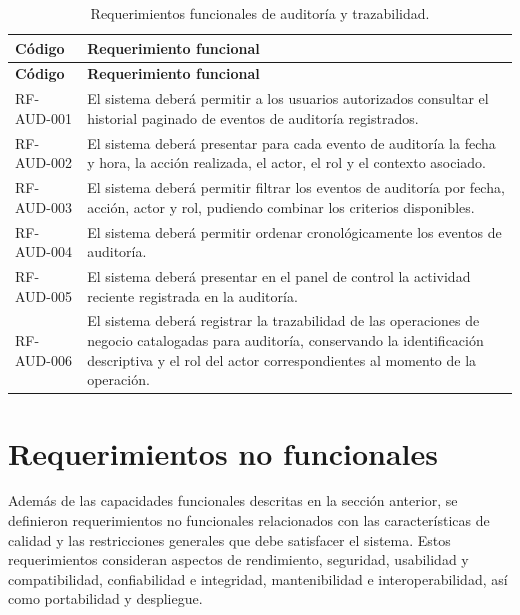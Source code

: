 \begin{longtable}{|p{}|p{}|}
    \caption{Requerimientos funcionales de auditoría y trazabilidad.}
    \label{tab:rf-aud}\\
    \hline
    \textbf{Código} & \textbf{Requerimiento funcional} \\
    \hline
    \endfirsthead

    \hline
    \textbf{Código} & \textbf{Requerimiento funcional} \\
    \hline
    \endhead

    RF-AUD-001 &
    El sistema deberá permitir a los usuarios autorizados consultar el
    historial paginado de eventos de auditoría registrados. \\
    \hline

    RF-AUD-002 &
    El sistema deberá presentar para cada evento de auditoría la fecha y hora,
    la acción realizada, el actor, el rol y el contexto asociado. \\
    \hline

    RF-AUD-003 &
    El sistema deberá permitir filtrar los eventos de auditoría por fecha,
    acción, actor y rol, pudiendo combinar los criterios disponibles. \\
    \hline

    RF-AUD-004 &
    El sistema deberá permitir ordenar cronológicamente los eventos de
    auditoría. \\
    \hline

    RF-AUD-005 &
    El sistema deberá presentar en el panel de control la actividad reciente
    registrada en la auditoría. \\
    \hline

    RF-AUD-006 &
    El sistema deberá registrar la trazabilidad de las operaciones de negocio
    catalogadas para auditoría, conservando la identificación descriptiva y el
    rol del actor correspondientes al momento de la operación. \\
    \hline
\end{longtable}


\section{Requerimientos no funcionales}
\label{sec:requerimientos-no-funcionales}

Además de las capacidades funcionales descritas en la sección anterior, se
definieron requerimientos no funcionales relacionados con las características
de calidad y las restricciones generales que debe satisfacer el sistema. Estos
requerimientos consideran aspectos de rendimiento, seguridad, usabilidad y
compatibilidad, confiabilidad e integridad, mantenibilidad e interoperabilidad,
así como portabilidad y despliegue.


